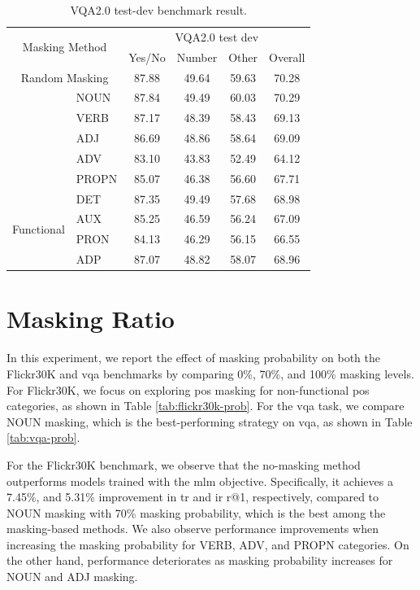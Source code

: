 \begin{table}[H]
    \centering
    \caption{VQA2.0 test-dev benchmark result.}
    \label{tab:vqa}
    \begin{adjustbox}{width=0.6\textwidth}
        \begin{tabular}{ll|cccc}
            \hline
            \multicolumn{2}{c|}{\multirow{2}{*}{Masking Method}} & \multicolumn{4}{c}{VQA2.0 test dev} \\
            & & Yes/No & Number & Other & Overall \\
            \hline
            \multicolumn{2}{c|}{Random Masking} & 87.88 & 49.64 & 59.63 & 70.28 \\
            \hline
            \rowcolor{gray}\multirow{5}{*}{Non-functional} & NOUN & 87.84 & 49.49 & 60.03 & 70.29 \\
            & VERB & 87.17 & 48.39 & 58.43 & 69.13 \\
            & ADJ & 86.69 & 48.86 & 58.64 & 69.09 \\
            & ADV & 83.10 & 43.83 & 52.49 & 64.12 \\
            & PROPN & 85.07 & 46.38 & 56.60 & 67.71 \\
            \hline
            \multirow{4}{*}{Functional} & DET & 87.35 & 49.49 & 57.68 & 68.98 \\
            & AUX & 85.25 & 46.59 & 56.24 & 67.09 \\
            & PRON & 84.13 & 46.29 & 56.15 & 66.55 \\
            & ADP & 87.07 & 48.82 & 58.07 & 68.96 \\
            \hline
        \end{tabular}
    \end{adjustbox}
\end{table}

\section{Masking Ratio}
In this experiment, we report the effect of masking probability on both the Flickr30K and \acrshort{vqa} benchmarks by comparing 0\%, 70\%, and 100\% masking levels.
For Flickr30K, we focus on exploring \acrshort{pos} masking for non-functional \acrshort{pos} categories, as shown in Table \ref{tab:flickr30k-prob}.
For the \acrshort{vqa} task, we compare NOUN masking, which is the best-performing strategy on \acrshort{vqa}, as shown in Table \ref{tab:vqa-prob}.

For the Flickr30K benchmark, we observe that the no-masking method outperforms models trained with the \acrshort{mlm} objective.
Specifically, it achieves a 7.45\%, and 5.31\% improvement in \acrshort{tr} and \acrshort{ir} r@1, respectively, compared to NOUN masking with 70\% masking probability, which is the best among the masking-based methods.
We also observe performance improvements when increasing the masking probability for VERB, ADV, and PROPN categories.
On the other hand, performance deteriorates as masking probability increases for NOUN and ADJ masking.

